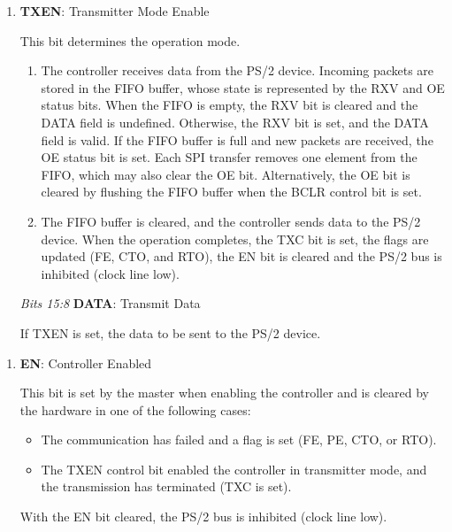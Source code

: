 \begin{description}[style=nextline]
\begin{enumerate}[
            label=\emph{Bit \arabic*}, widest=s 15:8,
            left=\parindent, align=left,
            itemsep=2.5\itemsep,
            start=0
        ]
        \item \textbf{TXEN}: Transmitter Mode Enable
        
        This bit determines the operation mode.
        \begin{enumerate}[label=\arabic*:, start=0]
            \item The controller receives data from the PS/2 device.
            Incoming packets are stored in the FIFO buffer, whose state is represented by the RXV and OE status bits. When the FIFO is empty, the RXV bit is cleared and the DATA field is undefined. Otherwise, the RXV bit is set, and the DATA field is valid. If the FIFO buffer is full and new packets are received, the OE status bit is set. Each SPI transfer removes one element from the FIFO, which may also clear the OE bit. Alternatively, the OE bit is cleared by flushing the FIFO buffer when the BCLR control bit is set.
    
            \item The FIFO buffer is cleared, and the controller sends data to the PS/2 device. When the operation completes, the TXC bit is set, the flags are updated (FE, CTO, and RTO), the EN bit is cleared and the PS/2 bus is inhibited (clock line low).
        \end{enumerate}
    
        \item[\emph{Bits 15:8}] \textbf{DATA}: Transmit Data
        
        If TXEN is set, the data to be sent to the PS/2 device.
    \end{enumerate}
    
    \item[MISO Packet]\hfill
    
        \begin{enumerate}[
            label=\emph{Bit \arabic*}, widest=s 15:8,
            left=\parindent, align=left,
            itemsep=2.5\itemsep,
            start=0
        ]
            \item \textbf{EN}: Controller Enabled
            
            This bit is set by the master when enabling the controller and is cleared by the hardware in one of the following cases:
            \begin{itemize}
                \item The communication has failed and a flag is set (FE, PE, CTO, or RTO).
                \item The TXEN control bit enabled the controller in transmitter mode, and the transmission has terminated (TXC is set).
            \end{itemize}
            With the EN bit cleared, the PS/2 bus is inhibited (clock line low).
            

\end{enumerate}
\end{description}
